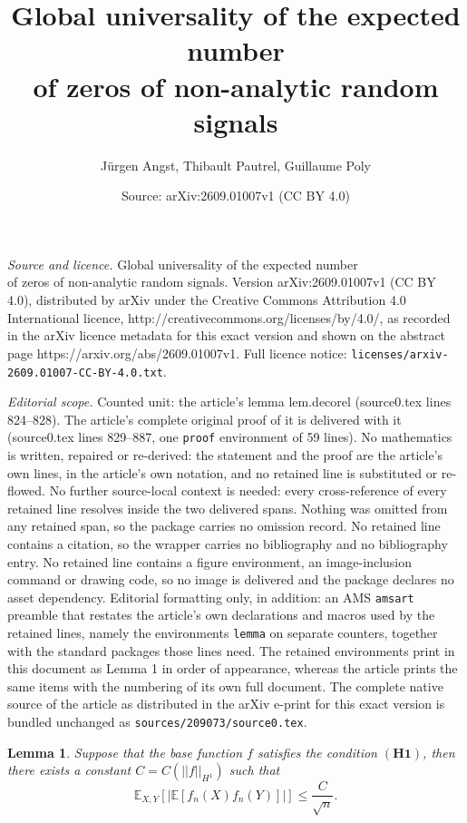 \documentclass[10pt,a4paper]{amsart}
\title{Global universality of the expected number \\of zeros of non-analytic random signals}
\author{J\"urgen Angst, Thibault Pautrel, Guillaume Poly}
\date{Source: arXiv:2609.01007v1 (CC BY 4.0)}
\newtheorem{lemma}{Lemma}
\begin{document}
\maketitle

\noindent\emph{Source and licence.} Global universality of the expected number \\of zeros of non-analytic random signals. Version arXiv:2609.01007v1 (CC BY 4.0), distributed by arXiv under the Creative Commons Attribution 4.0 International licence, http://creativecommons.org/licenses/by/4.0/, as recorded in the arXiv licence metadata for this exact version and shown on the abstract page https://arxiv.org/abs/2609.01007v1. Full licence notice: \texttt{licenses/arxiv-2609.01007-CC-BY-4.0.txt}.\par\smallskip

\noindent\textit{Editorial scope.} Counted unit: the article's lemma lem.decorel (source0.tex lines 824--828). The article's complete original proof of it is delivered with it (source0.tex lines 829--887, one \texttt{proof} environment of 59 lines). No mathematics is written, repaired or re-derived: the statement and the proof are the article's own lines, in the article's own notation, and no retained line is substituted or re-flowed.  No further source-local context is needed: every cross-reference of every retained line resolves inside the two delivered spans.  Nothing was omitted from any retained span, so the package carries no omission record.  No retained line contains a citation, so the wrapper carries no bibliography and no bibliography entry.  No retained line contains a figure environment, an image-inclusion command or drawing code, so no image is delivered and the package declares no asset dependency.  Editorial formatting only, in addition: an AMS \texttt{amsart} preamble that restates the article's own declarations and macros used by the retained lines, namely the environments \texttt{lemma} on separate counters, together with the standard packages those lines need.  The retained environments print in this document as Lemma 1 in order of appearance, whereas the article prints the same items with the numbering of its own full document.  The complete native source of the article as distributed in the arXiv e-print for this exact version is bundled unchanged as \texttt{sources/209073/source0.tex}.
\begin{lemma}{Suppose that the base function $f$ satisfies the condition $\mathbf{(H1)}$}, then there exists a constant $C=C(||f||_{H^1})$ such that
\[
\mathbb E_{X,Y} \left[ \left|\mathbb E[f_n(X)f_n(Y)] \right|\right]\leq \frac{C}{\sqrt{n}}.
\]\label{lem.decorel}
\end{lemma}
\end{document}
